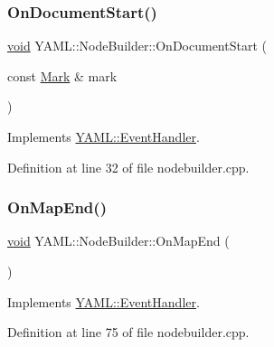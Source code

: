 \subsubsection{\texorpdfstring{OnDocumentStart()}{OnDocumentStart()}}
{\footnotesize\ttfamily \mbox{\hyperlink{glad_8h_a950fc91edb4504f62f1c577bf4727c29}{void}} Y\+A\+M\+L\+::\+Node\+Builder\+::\+On\+Document\+Start (\begin{DoxyParamCaption}\item[{const \mbox{\hyperlink{struct_y_a_m_l_1_1_mark}{Mark}} \&}]{mark }\end{DoxyParamCaption})\hspace{0.3cm}{\ttfamily [virtual]}}



Implements \mbox{\hyperlink{class_y_a_m_l_1_1_event_handler_adb739beb59e227bd320aab1e61bf42e4}{Y\+A\+M\+L\+::\+Event\+Handler}}.



Definition at line 32 of file nodebuilder.\+cpp.

\mbox{\label{class_y_a_m_l_1_1_node_builder_af6eee8daf61700c793e4e03acc49caf9}} 
\subsubsection{\texorpdfstring{OnMapEnd()}{OnMapEnd()}}
{\footnotesize\ttfamily \mbox{\hyperlink{glad_8h_a950fc91edb4504f62f1c577bf4727c29}{void}} Y\+A\+M\+L\+::\+Node\+Builder\+::\+On\+Map\+End (\begin{DoxyParamCaption}{ }\end{DoxyParamCaption})\hspace{0.3cm}{\ttfamily [virtual]}}



Implements \mbox{\hyperlink{class_y_a_m_l_1_1_event_handler_a6b8821803de4ecca96a05c3296fb565f}{Y\+A\+M\+L\+::\+Event\+Handler}}.



Definition at line 75 of file nodebuilder.\+cpp.

\mbox{\label{class_y_a_m_l_1_1_node_builder_a8afef9632f64f0d91113a28db10b5217}} 
